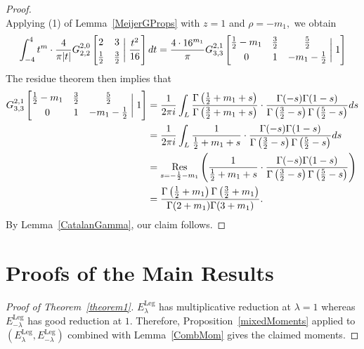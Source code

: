 \documentclass[12pt]{amsart}
\theoremstyle{definition}
\theoremstyle{remark}
\numberwithin{equation}{section}
\DeclareMathOperator{\Res}{Res}
\DeclareMathOperator{\Leg}{Leg}
\begin{document}
\begin{proof}
$$    $$
    Applying (1) of Lemma~\ref{MeijerGProps} with $z=1$ and $\rho=-m_1,$ we obtain
    $$
    \int_{-4}^4 t^m\cdot\frac{4}{\pi |t|} G_{2,2}^{2,0} \left[\begin{matrix} 2 & 3 \smallskip \\  \frac{1}{2} & \frac{3}{2}\end{matrix} \; \bigg| \; \frac{t^2}{16}\right]dt = \frac{4 \cdot 16^{m_1}}{\pi} G_{3,3}^{2,1} \left[\begin{matrix}\frac{1}{2} - m_1 & \frac{3}{2} & \frac{5}{2}\smallskip \\  0 & 1 & -m_1 - \frac{1}{2}\end{matrix} \; \bigg| \; 1 \right]
    $$
    The residue theorem then implies that
\begin{equation*}
\begin{split}
G_{3,3}^{2,1} \left[\begin{matrix}\frac{1}{2} - m_1 & \frac{3}{2} & \frac{5}{2}\smallskip \\  0 & 1 & -m_1 - \frac{1}{2}\end{matrix} \; \bigg| \; 1 \right] &= \frac{1}{2 \pi i} \int_{L} \frac{\Gamma\left(\frac{1}{2}+m_1+s\right)}{\Gamma\left(\frac{3}{2}+m_1+s\right)} \cdot \frac{\Gamma(-s)\Gamma(1-s)}{\Gamma\left(\frac{3}{2}-s\right)\Gamma\left(\frac{5}{2}-s\right)} ds\\
&= \frac{1}{2 \pi i} \int_{L} \frac{1}{\frac{1}{2}+m_1+s} \cdot \frac{\Gamma(-s)\Gamma(1-s)}{\Gamma\left(\frac{3}{2}-s\right)\Gamma\left(\frac{5}{2}-s\right)} ds\\
&= \underset{s = -\frac{1}{2}-m_1}{\Res} \left(\frac{1}{\frac{1}{2}+m_1+s} \cdot \frac{\Gamma(-s)\Gamma(1-s)}{\Gamma\left(\frac{3}{2}-s\right)\Gamma\left(\frac{5}{2}-s\right)} \right)\\
&= \frac{\Gamma\left(\frac{1}{2}+m_1\right)\Gamma\left(\frac{3}{2}+m_1\right)}{\Gamma(2+m_1)\Gamma(3+m_1)}.
\end{split}
\end{equation*}
By Lemma~\ref{CatalanGamma}, our claim follows.
\end{proof}

\section{Proofs of the Main Results}\label{Section8}

\begin{proof}[Proof of Theorem~\ref{theorem1}]
    $E_\lambda^{\Leg}$ has multiplicative reduction at $\lambda=1$ whereas $E_{-\lambda}^{\Leg}$ has good reduction at $1.$ Therefore, Proposition~\ref{mixedMoments} applied to $(E_\lambda^{\Leg},E_{-\lambda}^{\Leg})$ combined with Lemma~\ref{CombMom} gives the claimed moments.
\end{proof}
\end{document}
